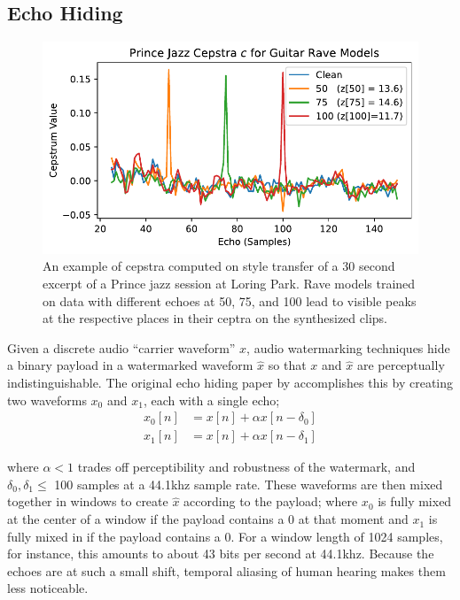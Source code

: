 \documentclass[letterpaper]{article} %
\begin{document}
\subsection{Echo Hiding}
\label{sec:echohiding}

\begin{figure}
    \centering
    \includegraphics[width=\columnwidth]{figs/RaveCepstra.pdf}
    \caption{An example of cepstra computed on style transfer of a 30 second excerpt of a Prince jazz session at Loring Park.  Rave models trained on data with different echoes at 50, 75, and 100 lead to visible peaks at the respective places in their ceptra on the synthesized clips.}
    \label{fig:ravecepstra}
\end{figure}

Given a discrete audio ``carrier waveform'' $x$, audio watermarking techniques hide a binary payload in a watermarked waveform $\hat{x}$ so that $x$ and $\hat{x}$ are perceptually indistinguishable.  The original echo hiding paper by \cite{gruhl1996echo} accomplishes this by creating two waveforms $x_0$ and $x_1$, each with a single echo; 
\begin{equation}
    \label{eq:echohidesingle}
    \begin{aligned}
        x_0[n] &= x[n] + \alpha x[n - \delta_0] \\
        x_1[n] &= x[n] + \alpha x[n - \delta_1]
    \end{aligned}
\end{equation}

 where $\alpha < 1$ trades off perceptibility and robustness of the watermark, and $\delta_0, \delta_1 \leq $ 100 samples at a 44.1khz sample rate.  These waveforms are then mixed together in windows to create $\hat{x}$ according to the payload; where $x_0$ is fully mixed at the center of a window if the payload contains a 0 at that moment and $x_1$ is fully mixed in if the payload contains a 0.  For a window length of 1024 samples, for instance, this amounts to about 43 bits per second at 44.1khz.  Because the echoes are at such a small shift, temporal aliasing of human hearing makes them less noticeable.
 
\end{document}
